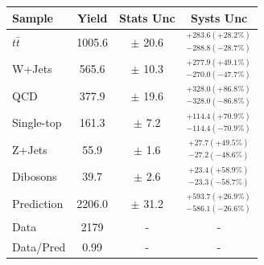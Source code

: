 \documentclass{beamer}
\newcommand*{\header}[1]{\fontsize{16}{8}\selectfont \textbf{{\color{MyPurple}{#1}}}}
\begin{document}
\begin{frame}
\begin{center}
\header{Boosted VR}
\end{center}
\begin{table}
\begin{center}
\tiny
\begin{tabular}{l|c|c|c}
Sample        &  Yield   &  Stats Unc &   Systs Unc \\
\hline
$t\bar{t}$    &  1005.6  & $\pm$ 20.6    &   $^{+283.6(+28.2\%)}_{-288.8(-28.7\%)}$ \\
W+Jets        &  565.6   & $\pm$ 10.3    &   $^{+277.9(+49.1\%)}_{-270.0(-47.7\%)}$ \\
QCD           &  377.9   & $\pm$ 19.6    &   $^{+328.0(+86.8\%)}_{-328.0(-86.8\%)}$ \\
Single-top    &  161.3   & $\pm$ 7.2     &   $^{+114.4(+70.9\%)}_{-114.4(-70.9\%)}$ \\
Z+Jets        &  55.9    & $\pm$ 1.6     &   $^{+27.7(+49.5\%)}_{-27.2(-48.6\%)}$ \\
Dibosons      &  39.7    & $\pm$ 2.6     &   $^{+23.4(+58.9\%)}_{-23.3(-58.7\%)}$ \\
\hline
Prediction    &  2206.0  & $\pm$ 31.2    &   $^{+593.7(+26.9\%)}_{-586.1(-26.6\%)}$ \\
Data          &  2179    & - & - \\
\hline
Data/Pred     &  0.99    & - & - \\
\hline
\end{tabular}
\end{center}
\end{table}
\end{frame}
\end{document}
